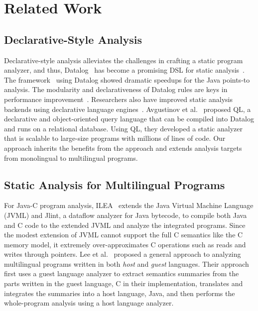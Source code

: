 \section{Related Work}\label{sec:related}

\subsection{Declarative-Style Analysis}
Declarative-style analysis alleviates the challenges in crafting a static program
analyzer, and thus, Datalog~\cite{allen2015D, allen2015stagedD, alpuente2010D,
doop, dawson1996D, naik2006D, reps1994D, smaragdakis2014D, whaley2005D} has
become a promising DSL for static analysis~\cite{scholz2016}.
The \doop framework~\cite{doop} using Datalog showed
dramatic speedups for the Java points-to analysis.  The
modularity and declarativeness of Datalog rules are keys in performance
improvement~\cite{doopWorkshop}.  Researchers also have improved static
analysis backends using declarative language engines~\cite{whaley2005D,
hoder2011muz, souffle, madsen2016}.  Avgustinov et al.~\cite{ql2016} proposed
QL, a declarative and object-oriented query language that can be compiled into
Datalog and runs on a relational database. Using QL, they developed a static
analyzer that is scalable to large-size programs with millions of lines of
code.  Our approach inherits the benefits from the approach and
extends analysis targets from monolingual to multilingual programs.

\subsection{Static Analysis for Multilingual Programs}
For Java-C program analysis, ILEA~\cite{ILEA} extends
the Java Virtual Machine Language (JVML) and Jlint, a dataflow analyzer for
Java bytecode, to compile both Java and C code to the extended JVML and analyze
the integrated programs.  Since the modest extension of JVML cannot
support the full C semantics like the C memory model, it extremely over-approximates C
operations such as reads and writes through pointers.  Lee et al.~\cite{LeeASE20}
proposed a general approach to analyzing multilingual programs written in both
{\it host} and {\it guest} languages.  Their approach first uses a guest
language analyzer to extract semantics summaries from the parts written in the
guest language, C in their implementation, translates and integrates the
summaries into a host language, Java, and then performs the whole-program
analysis using a host language analyzer. 

